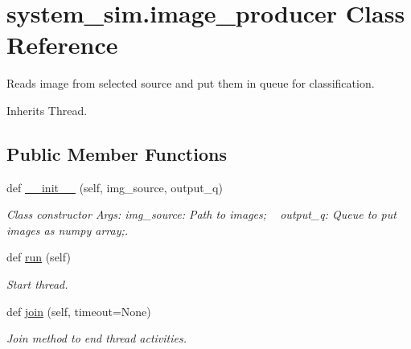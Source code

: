 \hypertarget{classsystem__sim_1_1image__producer}{}\section{system\+\_\+sim.\+image\+\_\+producer Class Reference}
\label{classsystem__sim_1_1image__producer}


Reads image from selected source and put them in queue for classification.  




Inherits Thread.

\subsection*{Public Member Functions}
\begin{DoxyCompactItemize}
\item 
\mbox{\label{classsystem__sim_1_1image__producer_a7940e350c5245174c46bcd631393898e}} 
def \mbox{\hyperlink{classsystem__sim_1_1image__producer_a7940e350c5245174c46bcd631393898e}{\+\_\+\+\_\+init\+\_\+\+\_\+}} (self, img\+\_\+source, output\+\_\+q)
\begin{DoxyCompactList}\small\item\em Class constructor Args\+: img\+\_\+source\+: Path to images; ~\newline
 output\+\_\+q\+: Queue to put images as numpy array;. \end{DoxyCompactList}\item 
\mbox{\label{classsystem__sim_1_1image__producer_a19f4aa078433403077e62a600530603b}} 
def \mbox{\hyperlink{classsystem__sim_1_1image__producer_a19f4aa078433403077e62a600530603b}{run}} (self)
\begin{DoxyCompactList}\small\item\em Start thread. \end{DoxyCompactList}\item 
\mbox{\label{classsystem__sim_1_1image__producer_ad7500fdbaf9e9b47b80751c0c37b5a83}} 
def \mbox{\hyperlink{classsystem__sim_1_1image__producer_ad7500fdbaf9e9b47b80751c0c37b5a83}{join}} (self, timeout=None)
\begin{DoxyCompactList}\small\item\em Join method to end thread activities. \end{DoxyCompactList}\end{DoxyCompactItemize}
